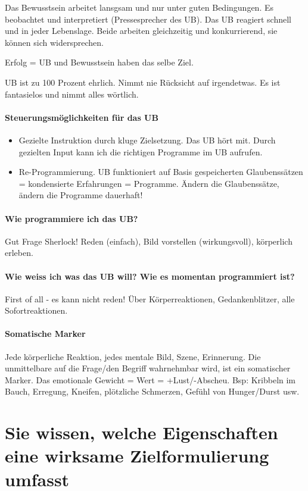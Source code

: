 Das Bewusstsein arbeitet lansgsam und nur unter guten Bedingungen. Es beobachtet und interpretiert (Pressesprecher des UB). Das UB reagiert schnell und in jeder Lebenslage. Beide arbeiten gleichzeitig und konkurrierend, sie können sich widersprechen. 

Erfolg = UB und Bewusstsein haben das selbe Ziel.

UB ist zu 100 Prozent ehrlich. Nimmt nie Rücksicht auf irgendetwas. Es ist fantasielos und nimmt alles wörtlich.

\paragraph{Steuerungsmöglichkeiten für das UB}
\begin{itemize}
	\item Gezielte Instruktion durch kluge Zielsetzung. Das UB hört mit. Durch gezielten Input kann ich die richtigen Programme im UB aufrufen.
	\item Re-Programmierung. UB funktioniert auf Basis gespeicherten Glaubenssätzen = kondensierte Erfahrungen = Programme. Ändern die Glaubenssätze, ändern die Programme dauerhaft! 
\end{itemize}

\paragraph{Wie programmiere ich das UB?}
Gut Frage Sherlock! Reden (einfach), Bild vorstellen (wirkungsvoll), körperlich erleben.

\paragraph{Wie weiss ich was das UB will? Wie es momentan programmiert ist?}
First of all - es kann nicht reden! Über Körperreaktionen, Gedankenblitzer, alle Sofortreaktionen.

\paragraph{Somatische Marker}
Jede körperliche Reaktion, jedes mentale Bild, Szene, Erinnerung. Die unmittelbare auf die Frage/den Begriff wahrnehmbar wird, ist ein somatischer Marker. Das emotionale Gewicht = Wert = +Lust/-Abscheu. Bsp: Kribbeln im Bauch, Erregung, Kneifen, plötzliche Schmerzen, Gefühl von Hunger/Durst usw.

\section{Sie wissen, welche Eigenschaften eine wirksame Zielformulierung umfasst}
\label{sec:how-to-be-successful-with-ub}

